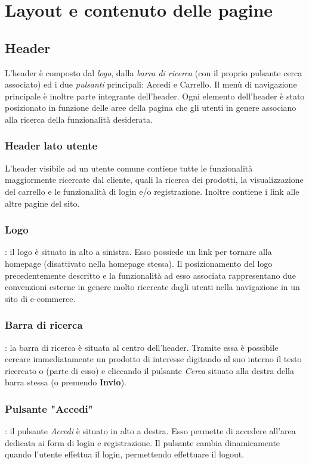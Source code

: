 \newpage
\section{Layout e contenuto delle pagine}

\subsection{Header}
L'header è composto dal \textit{logo}, dalla \textit{barra di ricerca} (con il proprio pulsante cerca associato) ed i due \textit{pulsanti} principali: Accedi e Carrello. Il menù di navigazione principale è inoltre parte integrante dell'header.
Ogni elemento dell'header è stato posizionato in funzione delle aree della pagina che gli utenti in genere associano alla ricerca della funzionalità desiderata. 

\subsubsection{Header lato utente}
L'header visibile ad un utente comune contiene tutte le funzionalità maggiormente ricercate dal cliente, quali la ricerca dei prodotti, la visualizzazione del carrello e le funzionalità di login e/o registrazione. Inoltre contiene i link alle altre pagine del sito.

\subsubsection{Logo}: il logo è situato in alto a sinistra. Esso possiede un link per tornare alla homepage (disattivato nella homepage stessa). Il posizionamento del logo precedentemente descritto e la funzionalità ad esso associata rappresentano due convenzioni esterne in genere molto ricercate dagli utenti nella navigazione in un sito di e-commerce.

\subsubsection{Barra di ricerca}: la barra di ricerca è situata al centro dell'header. Tramite essa è possibile cercare immediatamente un prodotto di interesse digitando al suo interno il testo ricercato o (parte di esso) e cliccando il pulsante \textit{Cerca} situato alla destra della barra stessa (o premendo \textbf{Invio}). 

\subsubsection{Pulsante "Accedi"}: il pulsante \textit{Accedi} è situato in alto a destra. Esso permette di accedere all'area dedicata ai form di login e registrazione. Il pulsante cambia dinamicamente quando l'utente effettua il login, permettendo effettuare il logout. 


